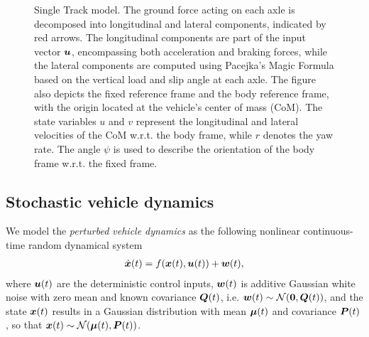 \begin{figure}
	\caption{Single Track model. The ground force acting on each axle is decomposed into longitudinal and lateral components, indicated by red arrows. The longitudinal components are part of the input vector $\boldsymbol{u}$, encompassing both acceleration and braking forces, while the lateral components are computed using Pacejka's Magic Formula based on the vertical load and slip angle at each axle. The figure also depicts the fixed reference frame and the body reference frame, with the origin located at the vehicle's center of mass (CoM). The state variables $u$ and $v$ represent the longitudinal and lateral velocities of the CoM w.r.t. the body frame, while $r$ denotes the yaw rate. The angle $\psi$ is used to describe the orientation of the body frame w.r.t. the fixed frame.}
	\label{fig:vehicle_model}
\end{figure}

\subsection{Stochastic vehicle dynamics}
\label{sec:stochastic_vehicle_dynamics}

We model the \emph{perturbed vehicle dynamics} as the following nonlinear continuous-time random dynamical system
\begin{align}
\dot{\boldsymbol{x}}(t) = f(\boldsymbol{x}(t), \boldsymbol{u}(t)) + \boldsymbol{w}(t),
\end{align}
where $\boldsymbol{u}(t)$ are the deterministic control inputs, $\boldsymbol{w}(t)$ is additive Gaussian white noise with zero mean and known covariance $\boldsymbol{Q}(t)$, i.e. $\boldsymbol{w}(t) \sim \mathcal{N}(\boldsymbol{0}, \boldsymbol{Q}(t))$, and the state $\boldsymbol{x}(t)$ results in a Gaussian distribution with mean $\boldsymbol{\mu}(t)$ and covariance $\boldsymbol{P}(t)$, so that $\boldsymbol{x}(t) \sim \mathcal{N}(\boldsymbol{\mu}(t), \boldsymbol{P}(t))$.


